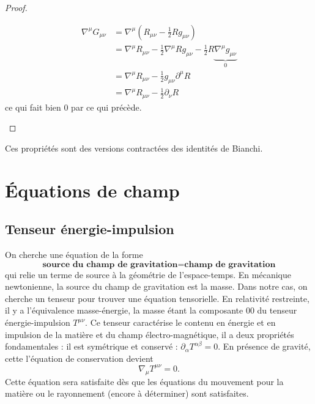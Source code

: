 \documentclass[a4paper,11pt]{report}
\theoremstyle{definition}
\theoremstyle{plain}
\theoremstyle{definition}
\theoremstyle{remark}
\newcommand{\p}{\partial}
\begin{document}
\begin{proof}
\begin{enumerate}[label = \textit{\roman*)}]
                \begin{align}
                    \nabla^\mu G_{\mu\nu} &= \nabla^\mu \left(R_{\mu\nu}-\frac{1}{2}Rg_{\mu\nu}\right)\\
                    &= \nabla^\mu R_{\mu\nu}-\frac{1}{2}\nabla^\mu Rg_{\mu\nu}-\frac{1}{2}R \underbrace{\nabla^\mu g_{\mu\nu}}_{0}\\
                    &= \nabla^\mu R_{\mu\nu} -\frac{1}{2}g_{\mu\nu}\p^\mu R \\
                    &= \nabla^\mu R_{\mu\nu} -\frac{1}{2}\p_\nu R 
                \end{align}
                ce qui fait bien $0$ par ce qui précède.
            \end{enumerate}
        \end{proof}
        
        Ces propriétés sont des versions contractées des identités de Bianchi.
                
    \section{Équations de champ}
    
        \subsection{Tenseur énergie-impulsion}
        
            On cherche une équation de la forme
            \begin{equation*}
                \textbf{source du champ de gravitation} = \textbf{champ de gravitation}
            \end{equation*}
            qui relie un terme de source à la géométrie de l'espace-temps. En mécanique newtonienne, la source du champ de gravitation est la masse. Dans notre cas, on cherche un tenseur pour trouver une équation tensorielle. En relativité restreinte, il y a l'équivalence masse-énergie, la masse étant la composante $00$ du tenseur énergie-impulsion $T^{\mu\nu}$. Ce tenseur caractérise le contenu en énergie et en impulsion de la matière et du champ électro-magnétique, il a deux propriétés fondamentales : il est symétrique et conservé : $\p_\alpha T^{\alpha\beta} = 0$. En présence de gravité, cette l'équation de conservation devient
            \begin{equation}
                \nabla_\mu T^{\mu\nu} = 0.
            \end{equation}
            Cette équation sera satisfaite dès que les équations du mouvement pour la matière ou le rayonnement (encore à déterminer) sont satisfaites.\\
            
\end{document}
